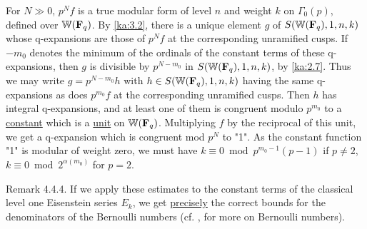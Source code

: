 \begin{kaproof}
For $N\gg 0$, $p^Nf$ is a true modular form of level $n$ and weight $k$ on
$\Gamma_0(p)$, defined over $\mathbb{W}(\mathbf{F}_q)$. By \eqref{ka:3.2}, there is a unique element $g$
of $S(\mathbb{W}(\mathbf{F}_q),1,n,k)$ whose q-expansions are those of $p^Nf$ at the
corresponding unramified cusps. If $-m_0$ denotes the minimum of the ordinals of
the constant terms of these q-expansions, then $g$ is divisible by $p^{N-m_0}$ in
$S(\mathbb{W}(\mathbf{F}_q),1,n,k)$, by \eqref{ka:2.7}. Thus we may write $g=p^{N-m_0}h$ with
$h\in S(\mathbb{W}(\mathbf{F}_q),1,n,k)$ having the same q-expansions as does $p^{m_0}f$ at the
corresponding unramified cusps. Then $h$ has integral q-expansions, and at least
one of them is congruent modulo $p^{m_0}$ to a \uline{constant} which is a
\uline{unit} on $\mathbb{W}(\mathbf{F}_q)$. Multiplying $f$ by the reciprocal of this unit, we
get a q-expansion which is congruent mod $p^N$ to "1". As the constant function
"1" is modular of weight zero, we must have $k\equiv 0 \bmod p^{m_0-1}(p-1)$ if
$p\neq 2$, $k\equiv 0 \bmod 2^{\alpha(m_0)}$ for $p=2$.
\end{kaproof}

\begin{kathmstar}{Remark 4.4.4.}
If we apply these estimates to the constant terms of the classical level one
Eisenstein series $E_k$, we get \uline{precisely} the correct bounds for the
denominators of the Bernoulli numbers (cf. \cite{serre-proceedings}, \cite{swinnerton-dyer-proceedings} for more on Bernoulli
numbers).
\end{kathmstar}


